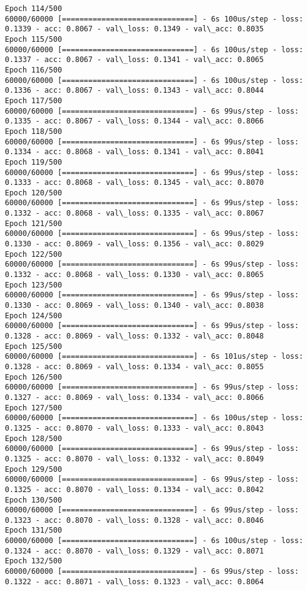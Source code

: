 \documentclass[11pt]{article}
\begin{document}
\begin{Verbatim}[commandchars=\\\{\}]
Epoch 114/500
60000/60000 [==============================] - 6s 100us/step - loss: 0.1339 - acc: 0.8067 - val\_loss: 0.1349 - val\_acc: 0.8035
Epoch 115/500
60000/60000 [==============================] - 6s 100us/step - loss: 0.1337 - acc: 0.8067 - val\_loss: 0.1341 - val\_acc: 0.8065
Epoch 116/500
60000/60000 [==============================] - 6s 100us/step - loss: 0.1336 - acc: 0.8067 - val\_loss: 0.1343 - val\_acc: 0.8044
Epoch 117/500
60000/60000 [==============================] - 6s 99us/step - loss: 0.1335 - acc: 0.8067 - val\_loss: 0.1344 - val\_acc: 0.8066
Epoch 118/500
60000/60000 [==============================] - 6s 99us/step - loss: 0.1334 - acc: 0.8068 - val\_loss: 0.1341 - val\_acc: 0.8041
Epoch 119/500
60000/60000 [==============================] - 6s 99us/step - loss: 0.1333 - acc: 0.8068 - val\_loss: 0.1345 - val\_acc: 0.8070
Epoch 120/500
60000/60000 [==============================] - 6s 99us/step - loss: 0.1332 - acc: 0.8068 - val\_loss: 0.1335 - val\_acc: 0.8067
Epoch 121/500
60000/60000 [==============================] - 6s 99us/step - loss: 0.1330 - acc: 0.8069 - val\_loss: 0.1356 - val\_acc: 0.8029
Epoch 122/500
60000/60000 [==============================] - 6s 99us/step - loss: 0.1332 - acc: 0.8068 - val\_loss: 0.1330 - val\_acc: 0.8065
Epoch 123/500
60000/60000 [==============================] - 6s 99us/step - loss: 0.1330 - acc: 0.8069 - val\_loss: 0.1340 - val\_acc: 0.8038
Epoch 124/500
60000/60000 [==============================] - 6s 99us/step - loss: 0.1328 - acc: 0.8069 - val\_loss: 0.1332 - val\_acc: 0.8048
Epoch 125/500
60000/60000 [==============================] - 6s 101us/step - loss: 0.1328 - acc: 0.8069 - val\_loss: 0.1334 - val\_acc: 0.8055
Epoch 126/500
60000/60000 [==============================] - 6s 99us/step - loss: 0.1327 - acc: 0.8069 - val\_loss: 0.1334 - val\_acc: 0.8066
Epoch 127/500
60000/60000 [==============================] - 6s 100us/step - loss: 0.1325 - acc: 0.8070 - val\_loss: 0.1333 - val\_acc: 0.8043
Epoch 128/500
60000/60000 [==============================] - 6s 99us/step - loss: 0.1325 - acc: 0.8070 - val\_loss: 0.1332 - val\_acc: 0.8049
Epoch 129/500
60000/60000 [==============================] - 6s 99us/step - loss: 0.1325 - acc: 0.8070 - val\_loss: 0.1334 - val\_acc: 0.8042
Epoch 130/500
60000/60000 [==============================] - 6s 99us/step - loss: 0.1323 - acc: 0.8070 - val\_loss: 0.1328 - val\_acc: 0.8046
Epoch 131/500
60000/60000 [==============================] - 6s 100us/step - loss: 0.1324 - acc: 0.8070 - val\_loss: 0.1329 - val\_acc: 0.8071
Epoch 132/500
60000/60000 [==============================] - 6s 99us/step - loss: 0.1322 - acc: 0.8071 - val\_loss: 0.1323 - val\_acc: 0.8064

\end{Verbatim}
\end{document}
